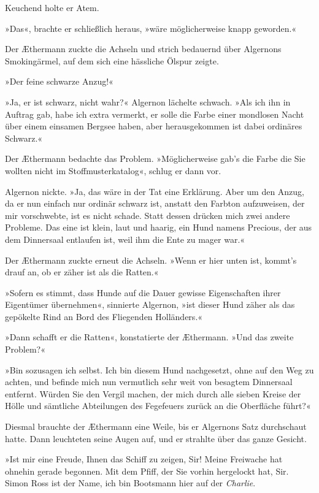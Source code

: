 Keuchend holte er Atem.

»Das«, brachte er schließlich heraus, »wäre möglicherweise knapp
geworden.«

Der Æthermann zuckte die Achseln und strich bedauernd über
Algernons Smokingärmel, auf dem sich eine hässliche Ölspur zeigte.

»Der feine schwarze Anzug!«

»Ja, er ist schwarz, nicht wahr?« Algernon lächelte schwach. »Als
ich ihn in Auftrag gab, habe ich extra vermerkt, er solle die Farbe
einer mondlosen Nacht über einem einsamen Bergsee haben, aber
herausgekommen ist dabei ordinäres Schwarz.«

Der Æthermann bedachte das Problem. »Möglicherweise gab’s die Farbe
die Sie wollten nicht im Stoffmusterkatalog«, schlug er dann vor.

Algernon nickte. »Ja, das wäre in der Tat eine Erklärung. Aber um
den Anzug, da er nun einfach nur ordinär schwarz ist, anstatt den
Farbton aufzuweisen, der mir vorschwebte, ist es nicht schade.
Statt dessen drücken mich zwei andere Probleme. Das eine ist klein,
laut und haarig, ein Hund namens Precious, der aus dem Dinnersaal
entlaufen ist, weil ihm die Ente zu mager war.«

Der Æthermann zuckte erneut die Achseln. »Wenn er hier unten ist,
kommt’s drauf an, ob er zäher ist als die Ratten.«

»Sofern es stimmt, dass Hunde auf die Dauer gewisse Eigenschaften
ihrer Eigentümer übernehmen«, sinnierte Algernon, »ist dieser Hund
zäher als das gepökelte Rind an Bord des Fliegenden Holländers.«

»Dann schafft er die Ratten«, konstatierte der Æthermann. »Und das
zweite Problem?«

»Bin sozusagen ich selbst. Ich bin diesem Hund nachgesetzt, ohne
auf den Weg zu achten, und befinde mich nun vermutlich sehr weit
von besagtem Dinnersaal entfernt. Würden Sie den Vergil machen, der
mich durch alle sieben Kreise der Hölle und sämtliche Abteilungen
des Fegefeuers zurück an die Oberfläche führt?«

Diesmal brauchte der Æthermann eine Weile, bis er Algernons Satz
durchschaut hatte. Dann leuchteten seine Augen auf, und er strahlte
über das ganze Gesicht.

»Ist mir eine Freude, Ihnen das Schiff zu zeigen, Sir! Meine
Freiwache hat ohnehin gerade begonnen. Mit dem Pfiff, der Sie
vorhin hergelockt hat, Sir. Simon Ross ist der Name, ich bin
Bootsmann hier auf der \textit{Charlie}.

